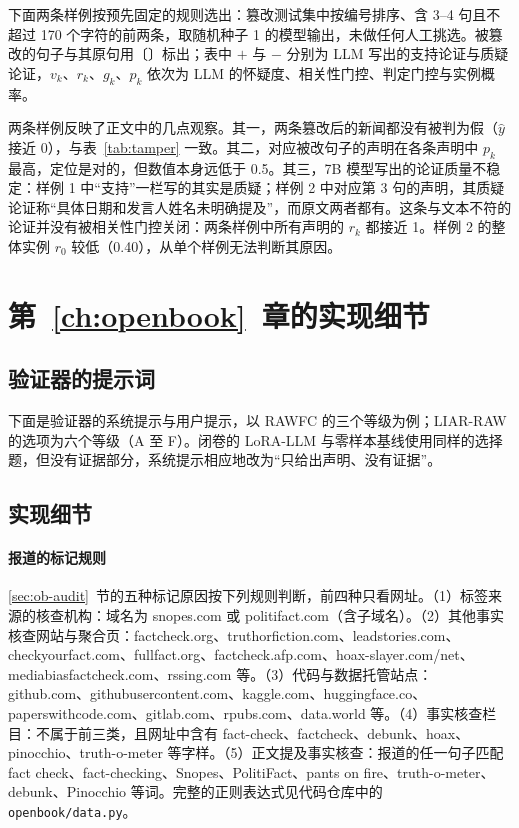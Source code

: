 下面两条样例按预先固定的规则选出：篡改测试集中按编号排序、含 3--4 句且不超过 170 个字符的前两条，取随机种子 1 的模型输出，未做任何人工挑选。被篡改的句子与其原句用〔〕标出；表中 $+$ 与 $-$ 分别为 LLM 写出的支持论证与质疑论证，$v_k$、$r_k$、$g_k$、$p_k$ 依次为 LLM 的怀疑度、相关性门控、判定门控与实例概率。

两条样例反映了正文中的几点观察。其一，两条篡改后的新闻都没有被判为假（$\hat y$ 接近 0），与表~\ref{tab:tamper} 一致。其二，对应被改句子的声明在各条声明中 $p_k$ 最高，定位是对的，但数值本身远低于 0.5。其三，7B 模型写出的论证质量不稳定：样例 1 中“支持”一栏写的其实是质疑；样例 2 中对应第 3 句的声明，其质疑论证称“具体日期和发言人姓名未明确提及”，而原文两者都有。这条与文本不符的论证并没有被相关性门控关闭：两条样例中所有声明的 $r_k$ 都接近 1。样例 2 的整体实例 $r_0$ 较低（0.40），从单个样例无法判断其原因。



\chapter{第~\ref{ch:openbook}~章的实现细节}\label{app:ob}

\section{验证器的提示词}\label{app:ob-prompt}

下面是验证器的系统提示与用户提示，以 RAWFC 的三个等级为例；LIAR-RAW 的选项为六个等级（A 至 F）。闭卷的 LoRA-LLM 与零样本基线使用同样的选择题，但没有证据部分，系统提示相应地改为“只给出声明、没有证据”。



\section{实现细节}\label{app:ob-impl}

\subsubsection{报道的标记规则}
\ref{sec:ob-audit}~节的五种标记原因按下列规则判断，前四种只看网址。（1）标签来源的核查机构：域名为 snopes.com 或 politifact.com（含子域名）。（2）其他事实核查网站与聚合页：factcheck.org、truthorfiction.com、leadstories.com、checkyourfact.com、fullfact.org、factcheck.afp.com、hoax-slayer.com/net、mediabiasfactcheck.com、rssing.com 等。（3）代码与数据托管站点：github.com、githubusercontent.com、kaggle.com、huggingface.co、paperswithcode.com、gitlab.com、rpubs.com、data.world 等。（4）事实核查栏目：不属于前三类，且网址中含有 fact-check、factcheck、debunk、hoax、pinocchio、truth-o-meter 等字样。（5）正文提及事实核查：报道的任一句子匹配 fact check、fact-checking、Snopes、PolitiFact、pants on fire、truth-o-meter、debunk、Pinocchio 等词。完整的正则表达式见代码仓库中的 \texttt{openbook/data.py}。

